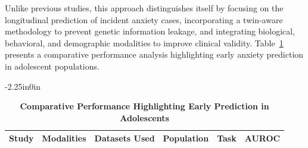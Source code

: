\documentclass[10pt,letterpaper]{article}
\begin{document}
                                                                                                                          Unlike previous studies, this approach distinguishes itself by focusing on the longitudinal prediction of incident anxiety cases, incorporating a twin-aware methodology to prevent genetic information leakage, and integrating biological, behavioral, and demographic modalities to improve clinical validity. Table~\ref{tab:performance_comparison} presents a comparative performance analysis highlighting early anxiety prediction in adolescent populations.


                                                                                                                          \begin{table}[!t]
                                                                                                                          \begin{adjustwidth}{-2.25in}{0in}
                                                                                                                          \centering
                                                                                                                          \caption{\textbf{Comparative Performance Highlighting Early Prediction in Adolescents}}
                                                                                                                          \label{tab:performance_comparison}
                                                                                                                          \footnotesize
                                                                                                                          \renewcommand{\arraystretch}{1.15}

                                                                                                                          \begin{tabular}{|p{3.0cm}|p{2.4cm}|p{3.6cm}|p{2.0cm}|p{2.0cm}|p{2.4cm}|}
                                                                                                                          \hline
                                                                                                                          \textbf{Study} & \textbf{Modalities} & \textbf{Datasets Used} & \textbf{Population} & \textbf{Task} & \textbf{AUROC} \\
                                                                                                                          \hline


\end{tabular}
\end{adjustwidth}
\end{table}
\end{document}
